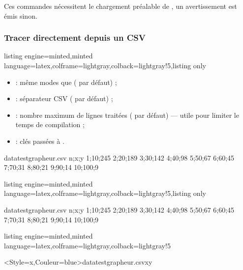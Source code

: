 \documentclass[11pt,a4paper]{ltxdoc}
\begin{document}
\begin{tcolorbox}[colframe=orange,colback=orange!5]
Ces commandes nécessitent le chargement préalable de , un avertissement est émis sinon.
\end{tcolorbox}

\subsubsection{Tracer directement depuis un CSV}

\begin{tcblisting}{listing engine=minted,minted language=latex,colframe=lightgray,colback=lightgray!5,listing only}
\end{tcblisting}

\begin{itemize}
  \item {} : même modes que  ( par défaut) ;
  \item {} : séparateur CSV ( par défaut) ;
  \item {} : nombre maximum de lignes traitées ( par défaut) — utile pour limiter le temps de compilation ;
  \item {} : clés passées à .
\end{itemize}

\begin{filecontents*}{datatestgrapheur.csv}
n;x;y
1;10;245
2;20;189
3;30;142
4;40;98
5;50;67
6;60;45
7;70;31
8;80;21
9;90;14
10;100;9
\end{filecontents*}

\begin{tcblisting}{listing engine=minted,minted language=latex,colframe=lightgray,colback=lightgray!5,listing only}
\begin{filecontents*}{datatestgrapheur.csv}
n;x;y
1;10;245
2;20;189
3;30;142
4;40;98
5;50;67
6;60;45
7;70;31
8;80;21
9;90;14
10;100;9
\end{filecontents*}
\end{tcblisting}

\begin{tcblisting}{listing engine=minted,minted language=latex,colframe=lightgray,colback=lightgray!5}
\begin{GraphiqueTikz}%
    [x=0.08cm,y=0.02cm,Xmin=0,Xmax=110,%
    Ymin=0,Ymax=250,Xgrille=10,Xgrilles=10,Ygrille=50,Ygrilles=50]
  \TracerNuageDepuisCSV<Style=x,Couleur=blue>{datatestgrapheur.csv}{x}{y}
\end{GraphiqueTikz}
\end{tcblisting}
\end{document}
